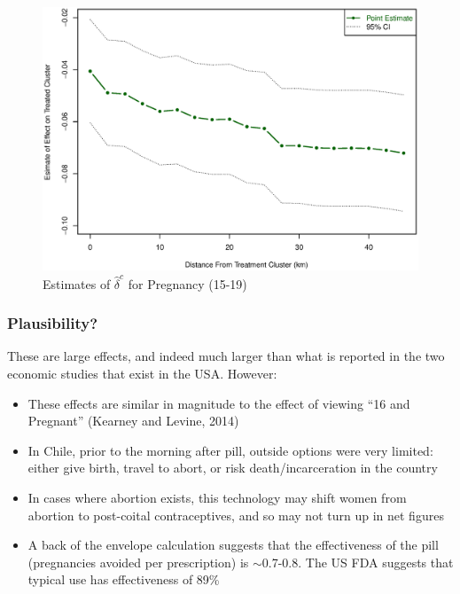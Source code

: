 \documentclass[10pt,letterpaper,subeqn]{beamer}
\begin{document}
\begin{frame}[label=dist1519]
\begin{figure}[htpb!]
\begin{center}
\caption{Estimates of $\hat\delta^c$ for Pregnancy (15-19)}
\label{TEENfig:Dist1519}
\vspace{-5mm}
\includegraphics[scale=0.44]{./../../Figures/Dist1519.eps} 
\end{center}
\end{figure}
\hyperlink{dist2034}{}
\end{frame}

\begin{frame}[label=plaus]
\frametitle{Plausibility?}
These are large effects, and indeed much larger than what is reported in the two economic studies that exist in the USA.  However:
\begin{itemize}
\item These effects are similar in magnitude to the effect of viewing ``16 and Pregnant'' (Kearney and Levine, 2014)
\item In Chile, prior to the morning after pill, outside options were very limited: either give birth, travel to abort, or risk death/incarceration in the country
\item In cases where abortion exists, this technology may shift women from abortion to post-coital contraceptives, and so may not turn up in net figures
\item A back of the envelope calculation suggests that the effectiveness of the pill (pregnancies avoided per prescription) is $\sim$0.7-0.8.  The US FDA suggests that typical use has effectiveness of 89\%
\hyperlink{plausR}{}
\end{itemize}
\end{frame}
\end{document}
